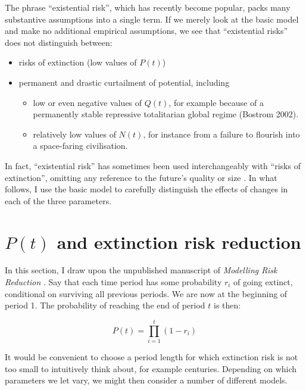 \documentclass[british]{article}
\begin{document}
The phrase ``existential risk'', which has recently become popular, packs many substantive assumptions into a single term. If we merely look at the basic model and make no additional empirical assumptions, we see that ``existential risks'' does not distinguish between:
\begin{itemize}
\item
  risks of extinction (low values of \(P(t)\))
\item
  permanent and drastic curtailment of potential, including
  \begin{itemize}
  \item
    low or even negative values of \(Q(t)\), for example because of a
    permanently stable repressive totalitarian global regime (Bostrom
    2002).
  \item
    relatively low values of \(N(t)\), for instance from a failure to flourish into a space-faring civilisation.
  \end{itemize}
\end{itemize}

In fact, ``existential risk'' has sometimes been used interchangeably with
``risks of extinction'', omitting any reference to the future's quality
or size \citep{althaus_reducing_2016}. In what follows, I use the
basic model to carefully distinguish the effects of changes in each of the three parameters.

\section{$P(t)$ and extinction risk reduction}\label{pt}

In this section, I draw upon the unpublished manuscript of \emph{Modelling Risk Reduction} \citep{ord_modelling_2014}. Say that each time period has some probability \(r_i\) of going extinct, conditional on surviving all previous periods. We are now at the beginning of period 1. The probability of reaching the end of period \(t\) is then:

\begin{equation}
  P(t) = \prod_{i=1}^{t}(1-r_i) \label{eq:pt}
\end{equation}


It would be convenient to choose a period length for which extinction risk is not too
small to intuitively think about, for example centuries. Depending on which parameters we let vary, we might then consider a number of
different models.
\end{document}
